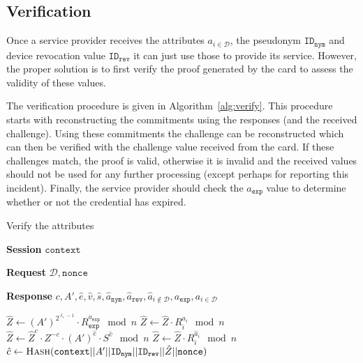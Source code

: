 \subsection{Verification}

Once a service provider receives the attributes $a_{i \in \mathcal{D}}$, the pseudonym $\mathtt{ID_{nym}}$ and device revocation value $\mathtt{ID_{rev}}$ it can just use those to provide its service. However, the proper solution is to first verify the proof generated by the card to assess the validity of these values.

The verification procedure is given in Algorithm~\ref{alg:verify}. This procedure starts with reconstructing the commitments using the responses (and the received challenge). Using these commitments the challenge can be reconstructed which can then be verified with the challenge value received from the card. If these challenges match, the proof is valid, otherwise it is invalid and the received values should not be used for any further processing (except perhaps for reporting this incident). Finally, the service provider should check the $a_{\mathtt{exp}}$ value to determine whether or not the credential has expired.

\begin{algorithm}
  \caption{Verify the attributes}
  \label{alg:verify}
  \addtolength{\baselineskip}{1.5mm}

  \begin{algorithmic}[1]
    \item[\textbf{Session}] $\mathtt{context}$
    \item[\textbf{Request}] $\mathcal{D}, \mathtt{nonce}$
    \item[\textbf{Response}] $c, A', \hat{e}, \hat{v}, \hat{s}, \hat{a}_\mathtt{nym}, \hat{a}_\mathtt{rev}, \hat{a}_{i \notin \mathcal{D}}, a_\mathtt{exp}, a_{i \in \mathcal{D}}$

    \Statex
      \Statex {}
      \State $\hat{Z} \gets (A')^{2^{\ell_e - 1}} \cdot R_\mathtt{exp}^{a_\mathtt{exp}} \mod n$
       
        \State $\hat{Z} \gets \hat{Z} \cdot R_i^{a_i} \mod n$
      \EndFor
      \State $\hat{Z} \gets \hat{Z}^c \cdot Z^{-c} \cdot (A')^{\hat{e}} \cdot S^{\hat{v}} \mod n$
       
        \State $\hat{Z} \gets \hat{Z} \cdot R_i^{\hat{a}_i} \mod n$
      \EndFor
      \Statex {}
      \State $\hat{c} \gets \Call{Hash}{\mathtt{context} || A' || \mathtt{ID_{nym}} || \mathtt{ID_{rev}} ||
        \hat{Z} || \mathtt{nonce}}$
      \Statex {}
        \Return {}
      \Else
        \Return {}
      \EndIf
    \EndFunction
  \end{algorithmic}
\end{algorithm}
